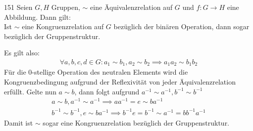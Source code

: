 \begin{algebraUE}{151}
Seien $G,H$ Gruppen, $\sim$ eine Äquivalenzrelation auf $G$ und $f: G \rightarrow H$
eine Abbildung. Dann gilt: \\
Ist $\sim$ eine Kongruenzrelation auf $G$ bezüglich der binären Operation, dann
sogar bezüglich der Gruppenstruktur.
\end{algebraUE}
\begin{solution}
Es gilt also:
\begin{align*}
  \forall a,b,c,d \in G: a_1 \sim b_1, a_2 \sim b_2 \implies a_1a_2 \sim b_1b_2
\end{align*}
Für die 0-stellige Operation des neutralen Elements wird die Kongruenzbedingung
aufgrund der Reflexivität von jeder Äquivalenzrelation erfüllt.
Gelte nun $a \sim b$, dann folgt aufgrund $a^{-1} \sim a^{-1}, b^{-1} \sim b^{-1}$
\begin{align*}
  a \sim b, a^{-1} \sim a^{-1} \implies aa^{-1} = e \sim ba^{-1} \\
  b^{-1} \sim b^{-1}, e \sim ba^{-1} \implies  b^{-1}e = b^{-1} \sim a^{-1} = bb^{-1}a^{-1}
\end{align*}
Damit ist $\sim$ sogar eine Kongruenzrelation bezüglich der Gruppenstruktur.
\end{solution}
